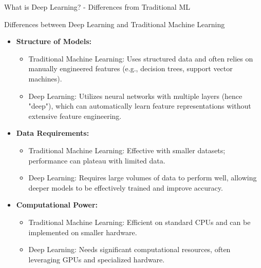 \documentclass[aspectratio=169]{beamer}
\begin{document}
\begin{frame}[fragile]{What is Deep Learning? - Differences from Traditional ML}
    \begin{block}{Differences between Deep Learning and Traditional Machine Learning}
        \begin{itemize}
            \item \textbf{Structure of Models:}
            \begin{itemize}
                \item Traditional Machine Learning: Uses structured data and often relies on manually engineered features (e.g., decision trees, support vector machines).
                \item Deep Learning: Utilizes neural networks with multiple layers (hence "deep"), which can automatically learn feature representations without extensive feature engineering.
            \end{itemize}
            
            \item \textbf{Data Requirements:}
            \begin{itemize}
                \item Traditional Machine Learning: Effective with smaller datasets; performance can plateau with limited data.
                \item Deep Learning: Requires large volumes of data to perform well, allowing deeper models to be effectively trained and improve accuracy.
            \end{itemize}
            
            \item \textbf{Computational Power:}
            \begin{itemize}
                \item Traditional Machine Learning: Efficient on standard CPUs and can be implemented on smaller hardware.
                \item Deep Learning: Needs significant computational resources, often leveraging GPUs and specialized hardware.
            \end{itemize}
        \end{itemize}
    \end{block}
\end{frame}
\end{document}
